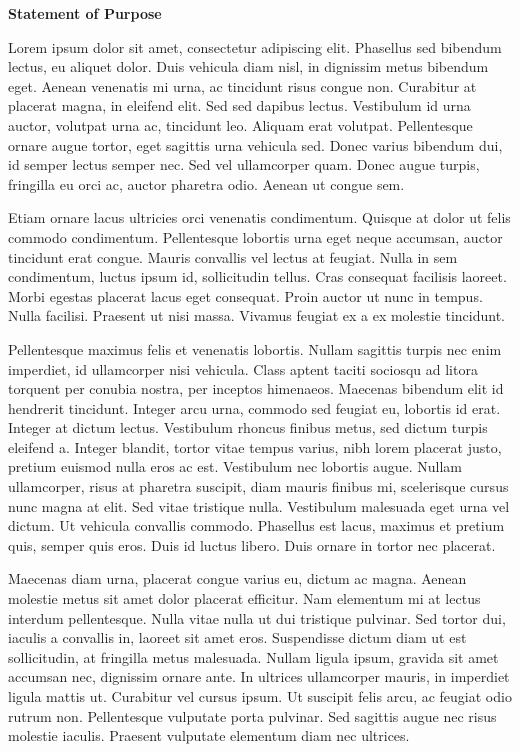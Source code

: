 \documentclass{article}
\begin{document}
\begin{center}
    \textbf{Statement of Purpose}
\end{center}
Lorem ipsum dolor sit amet, consectetur adipiscing elit. Phasellus sed bibendum
lectus, eu aliquet dolor. Duis vehicula diam nisl, in dignissim metus bibendum
eget. Aenean venenatis mi urna, ac tincidunt risus congue non. Curabitur at
placerat magna, in eleifend elit. Sed sed dapibus lectus. Vestibulum id urna
auctor, volutpat urna ac, tincidunt leo. Aliquam erat volutpat. Pellentesque
ornare augue tortor, eget sagittis urna vehicula sed. Donec varius bibendum
dui, id semper lectus semper nec. Sed vel ullamcorper quam. Donec augue turpis,
fringilla eu orci ac, auctor pharetra odio. Aenean ut congue sem.

Etiam ornare lacus ultricies orci venenatis condimentum. Quisque at dolor ut
felis commodo condimentum. Pellentesque lobortis urna eget neque accumsan,
auctor tincidunt erat congue. Mauris convallis vel lectus at feugiat. Nulla in
sem condimentum, luctus ipsum id, sollicitudin tellus. Cras consequat facilisis
laoreet. Morbi egestas\cite{matrixCalculusYouNeed} placerat lacus eget
consequat. Proin auctor ut nunc in tempus. Nulla facilisi. Praesent ut nisi
massa. Vivamus feugiat ex a ex molestie tincidunt.

Pellentesque maximus felis et venenatis lobortis. Nullam sagittis turpis nec
enim imperdiet, id ullamcorper nisi vehicula. Class aptent taciti sociosqu ad
litora torquent per conubia nostra, per inceptos himenaeos. Maecenas bibendum
elit id hendrerit tincidunt. Integer arcu urna, commodo sed feugiat eu,
lobortis id erat. Integer at dictum lectus. Vestibulum rhoncus finibus metus,
sed dictum turpis eleifend a. Integer blandit, tortor vitae tempus varius, nibh
lorem placerat justo, pretium euismod nulla eros ac est. Vestibulum nec
lobortis augue. Nullam ullamcorper, risus at pharetra suscipit, diam mauris
finibus mi, scelerisque cursus nunc magna at elit. Sed vitae tristique nulla.
Vestibulum malesuada eget urna vel dictum. Ut vehicula convallis commodo.
Phasellus est lacus, maximus et pretium quis, semper quis eros. Duis id luctus
libero. Duis ornare in tortor nec placerat.

Maecenas diam urna, placerat congue varius eu, dictum ac magna. Aenean molestie
metus sit amet dolor placerat efficitur. Nam elementum mi at lectus interdum
pellentesque. Nulla vitae nulla ut dui tristique pulvinar. Sed tortor dui,
iaculis a convallis in, laoreet sit amet eros. Suspendisse dictum diam ut est
sollicitudin, at fringilla metus malesuada. Nullam ligula ipsum, gravida sit
amet accumsan nec, dignissim ornare ante. In ultrices ullamcorper mauris, in
imperdiet ligula mattis ut. Curabitur vel cursus ipsum. Ut suscipit felis arcu,
ac feugiat odio rutrum non. Pellentesque vulputate porta pulvinar. Sed sagittis
augue nec risus molestie iaculis. Praesent vulputate elementum diam nec
ultrices.
\end{document}

